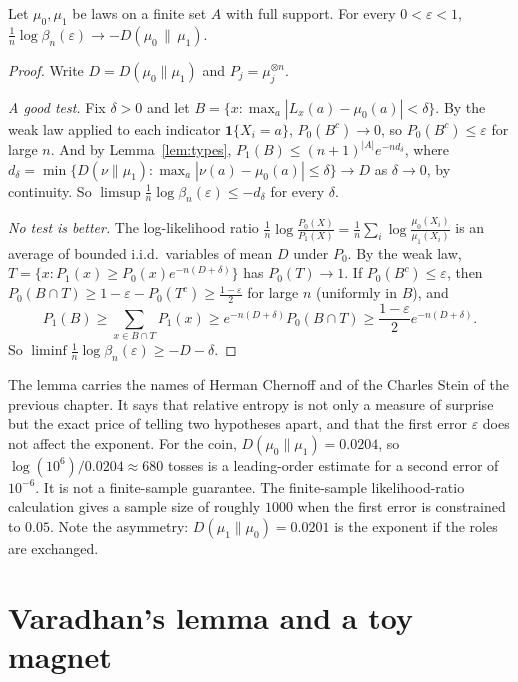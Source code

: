 \begin{theorem}\label{thm:chernoffstein}
Let $\mu_0,\mu_1$ be laws on a finite set $A$ with full support. For every $0<\varepsilon<1$, $\displaystyle\frac1n\log\beta_n(\varepsilon)\to-D(\mu_0\,\|\,\mu_1)$.
\end{theorem}
\begin{proof}
Write $D=D(\mu_0\|\mu_1)$ and $P_j=\mu_j^{\otimes n}$.

\emph{A good test.} Fix $\delta>0$ and let $B=\{x:\max_a|L_x(a)-\mu_0(a)|<\delta\}$. By the weak law applied to each indicator $\mathbf 1\{X_i=a\}$, $P_0(B^c)\to0$, so $P_0(B^c)\le\varepsilon$ for
large $n$. And by Lemma~\ref{lem:types}, $P_1(B)\le(n+1)^{|A|}e^{-nd_\delta}$, where $d_\delta=\min\{D(\nu\|\mu_1):\max_a|\nu(a)-\mu_0(a)|\le\delta\}\to D$ as $\delta\to0$, by continuity. So
$\limsup\frac1n\log\beta_n(\varepsilon)\le-d_\delta$ for every $\delta$.

\emph{No test is better.} The log-likelihood ratio $\frac1n\log\frac{P_0(X)}{P_1(X)}=\frac1n\sum_i\log\frac{\mu_0(X_i)}{\mu_1(X_i)}$ is an average of bounded i.i.d.\ variables of mean $D$ under $P_0$.
By the weak law, $T=\{x:P_1(x)\ge P_0(x)e^{-n(D+\delta)}\}$ has $P_0(T)\to1$. If $P_0(B^c)\le\varepsilon$, then $P_0(B\cap T)\ge1-\varepsilon-P_0(T^c)\ge\frac{1-\varepsilon}2$ for large $n$ (uniformly in $B$), and
\[
P_1(B)\ge\sum_{x\in B\cap T}P_1(x)\ge e^{-n(D+\delta)}P_0(B\cap T)\ge\frac{1-\varepsilon}2e^{-n(D+\delta)}.
\]
So $\liminf\frac1n\log\beta_n(\varepsilon)\ge-D-\delta$.
\end{proof}

The lemma carries the names of Herman Chernoff and of the Charles Stein of the previous chapter. It says that relative entropy is not only a measure of surprise but the
exact price of telling two hypotheses apart, and that the first error $\varepsilon$ does not affect the exponent. For the coin, $D(\mu_0\|\mu_1)=0.0204$, so $\log(10^6)/0.0204\approx680$ tosses is a leading-order estimate for a second error of $10^{-6}$. It is not a finite-sample guarantee. The finite-sample likelihood-ratio calculation gives a sample size of roughly $1000$ when the first error is constrained to $0.05$. Note the asymmetry: $D(\mu_1\|\mu_0)=0.0201$ is the exponent if the roles are exchanged.

\section{Varadhan's lemma and a toy magnet}

